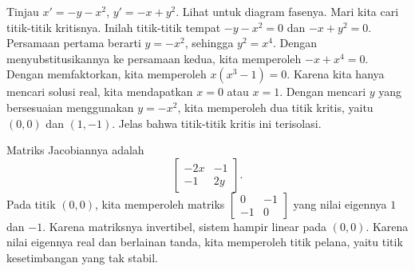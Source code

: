 \begin{example} \label{example:nlin-xplusy}
Tinjau
$x'=-y-x^2$,
$y'=-x+y^2$.
Lihat  untuk diagram fasenya.
Mari kita cari titik-titik kritisnya. Inilah titik-titik tempat
$-y-x^2 = 0$ dan $-x+y^2=0$. Persamaan pertama berarti $y = -x^2$, sehingga
$y^2 = x^4$. Dengan menyubstitusikannya ke persamaan kedua, kita memperoleh
$-x+x^4 = 0$. Dengan memfaktorkan, kita memperoleh $x(x^3-1)=0$. Karena kita hanya mencari
solusi real, kita mendapatkan $x=0$ atau $x=1$. Dengan mencari $y$ yang
bersesuaian menggunakan $y = -x^2$, kita memperoleh dua titik kritis, yaitu $(0,0)$
dan $(1,-1)$. Jelas bahwa titik-titik kritis ini terisolasi.

\begin{myfig}
\capstart
{}
\caption{Potret fase beserta beberapa contoh lintasan dari
$x'=-y-x^2$, $y'=-x+y^2$. \label{fig:nlin-ex813-new}}
\end{myfig}

Matriks Jacobiannya adalah
\begin{equation*}
\begin{bmatrix}
-2x & -1 \\
-1 & 2y
\end{bmatrix} .
\end{equation*}
Pada titik $(0,0)$, kita memperoleh matriks
$\left[ \begin{smallmatrix} 0 & -1 \\ -1 & 0 \end{smallmatrix} \right]$
yang nilai eigennya $1$ dan $-1$. Karena matriksnya invertibel, sistem hampir linear
pada $(0,0)$. Karena nilai eigennya real
dan berlainan tanda, kita memperoleh titik pelana, yaitu titik kesetimbangan
yang tak stabil.


\end{example}
